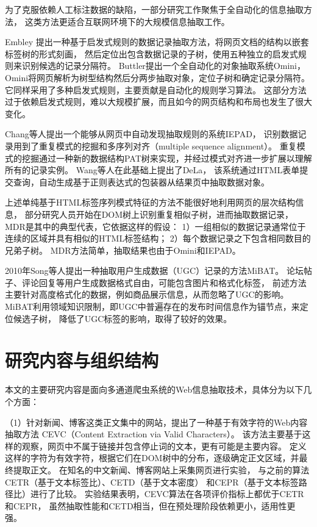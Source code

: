 为了克服依赖人工标注数据的缺陷，一部分研究工作聚焦于全自动化的信息抽取方法，
这类方法更适合互联网环境下的大规模信息抽取工作。

Embley
提出一种基于启发式规则的数据记录抽取方法，将网页文档的结构以嵌套标签树的形式刻画，
然后定位出包含数据记录的子树，使用五种独立的启发式规则来识别候选的记录分隔符。
Buttler提出一个全自动化的对象抽取系统Omini，
Omini将网页解析为树型结构然后分两步抽取对象，定位子树和确定记录分隔符。
它同样采用了多种启发式规则，主要贡献是自动化的规则学习算法。
这部分方法过于依赖启发式规则，难以大规模扩展，而且如今的网页结构和布局也发生了很大变化。

Chang等人提出一个能够从网页中自动发现抽取规则的系统IEPAD，
识别数据记录用到了重复模式的挖掘和多序列对齐（multiple sequence alignment）。
重复模式的挖掘通过一种新的数据结构PAT树来实现，并经过模式对齐进一步扩展以理解所有的记录实例。
Wang等人在此基础上提出了DeLa，
该系统通过HTML表单提交查询，自动生成基于正则表达式的包装器从结果页中抽取数据对象。

上述单纯基于HTML标签序列模式特征的方法不能很好地利用网页的层次结构信息，
部分研究人员开始在DOM树上识别重复相似子树，进而抽取数据记录，
MDR是其中的典型代表，它依据这样的假设：
1）一组相似的数据记录通常位于连续的区域并具有相似的HTML标签结构；
2）每个数据记录之下包含相同数目的兄弟子树。
MDR方法简单，抽取结果也由于Omini和IEPAD。

2010年Song等人提出一种抽取用户生成数据（UGC）记录的方法MiBAT。
论坛帖子、评论回复等用户生成数据格式自由，可能包含图片和格式化标签，
前述方法主要针对高度格式化的数据，例如商品展示信息，从而忽略了UGC的影响。
MiBAT利用领域知识限制，即UGC中普遍存在的发布时间信息作为锚节点，来定位候选子树，
降低了UGC标签的影响，取得了较好的效果。

\section{研究内容与组织结构}

本文的主要研究内容是面向多通道爬虫系统的Web信息抽取技术，具体分为以下几个方面：

（1）针对新闻、博客这类正文集中的网站，提出了一种基于有效字符的Web内容抽取方法
CEVC（Content Extraction via Valid Characters）。
该方法主要基于这样的观察，网页中不属于链接并包含停止词的文本，更有可能是主要内容。
定义这样的字符为有效字符，根据它们在DOM树中的分布，逐级确定正文区域，并最终提取正文。
在知名的中文新闻、博客网站上采集网页进行实验，
与之前的算法CETR（基于文本标签比）、CETD（基于文本密度）
和CEPR（基于文本标签路径比）进行了比较。
实验结果表明，CEVC算法在各项评价指标上都优于CETR和CEPR，
虽然抽取性能和CETD相当，但在预处理阶段依赖更小，适用性更强。

